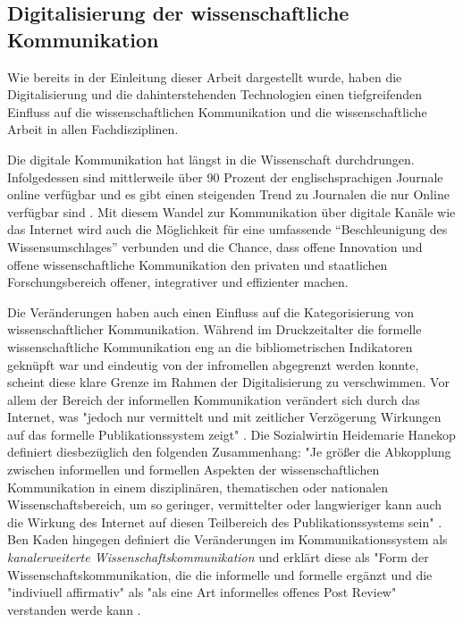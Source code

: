 \subsection{Digitalisierung der wissenschaftliche Kommunikation}

Wie bereits in der Einleitung dieser Arbeit dargestellt wurde, haben die Digitalisierung und die dahinterstehenden Technologien einen tiefgreifenden Einfluss auf die wissenschaftlichen Kommunikation und die wissenschaftliche Arbeit in allen Fachdisziplinen.

Die digitale Kommunikation hat längst in die Wissenschaft durchdrungen. Infolgedessen sind mittlerweile über 90 Prozent der englischsprachigen Journale online verfügbar und es gibt einen steigenden Trend zu Journalen die nur Online verfügbar sind \cite{cope2014future}. Mit diesem Wandel zur Kommunikation über digitale Kanäle wie das Internet wird auch die Möglichkeit für eine umfassende “Beschleunigung des Wissensumschlages” verbunden \cite{Wenzel_2003} und die Chance, dass offene Innovation und offene wissenschaftliche Kommunikation den privaten und staatlichen Forschungsbereich offener, integrativer und effizienter machen.

Die Veränderungen haben auch einen Einfluss auf die Kategorisierung von wissenschaftlicher Kommunikation. Während im Druckzeitalter die formelle wissenschaftliche Kommunikation eng an die bibliometrischen Indikatoren geknüpft war und eindeutig von der infromellen abgegrenzt werden konnte, scheint diese klare Grenze im Rahmen der Digitalisierung zu verschwimmen. Vor allem der Bereich der informellen Kommunikation verändert sich durch das Internet, was "jedoch nur vermittelt und mit zeitlicher Verzögerung Wirkungen auf das formelle Publikationssystem zeigt" \cite{Hanekop_2014}. Die Sozialwirtin Heidemarie Hanekop definiert diesbezüglich den folgenden Zusammenhang: "Je größer die Abkopplung zwischen informellen und formellen Aspekten der wissenschaftlichen Kommunikation in einem disziplinären, thematischen oder nationalen Wissenschaftsbereich, um so geringer, vermittelter oder langwieriger kann auch die Wirkung des Internet auf diesen Teilbereich des Publikationssystems sein" \cite{Hanekop_2014}. Ben Kaden hingegen definiert die Veränderungen im Kommunikationssystem als \textit{kanalerweiterte Wissenschaftskommunikation} und erklärt diese als "Form der Wissenschaftskommunikation, die die informelle und formelle ergänzt und die "indiviuell affirmativ" als "als eine Art informelles offenes Post Review" verstanden werde kann \cite{kaden_2009_library}.

